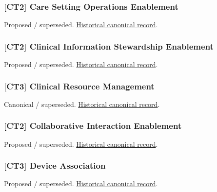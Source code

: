 \subsubsection{[CT2] Care Setting Operations Enablement}

\par\label{element:a03741e6e98642bea44680d23fdcb434}
Proposed / superseded. \href{../../../../continuum/strategy/capability/a03741e6e98642bea44680d23fdcb434.md}{Historical canonical record}.\par

\subsubsection{[CT2] Clinical Information Stewardship Enablement}

\par\label{element:3811c758ff2140c39a801bf89f75098a}
Proposed / superseded. \href{../../../../continuum/strategy/capability/3811c758ff2140c39a801bf89f75098a.md}{Historical canonical record}.\par

\subsubsection{[CT3] Clinical Resource Management}

\par\label{element:a5faedcd97064c28b9e7e551e9106ea1}
Canonical / superseded. \href{../../../../continuum/strategy/capability/a5faedcd97064c28b9e7e551e9106ea1.md}{Historical canonical record}.\par

\subsubsection{[CT2] Collaborative Interaction Enablement}

\par\label{element:6140b21c874241d092708e2411caceed}
Proposed / superseded. \href{../../../../continuum/strategy/capability/6140b21c874241d092708e2411caceed.md}{Historical canonical record}.\par

\subsubsection{[CT3] Device Association}

\par\label{element:902daf2ce9714876bbfee52eef1a7ab0}
Proposed / superseded. \href{../../../../continuum/strategy/capability/902daf2ce9714876bbfee52eef1a7ab0.md}{Historical canonical record}.\par

